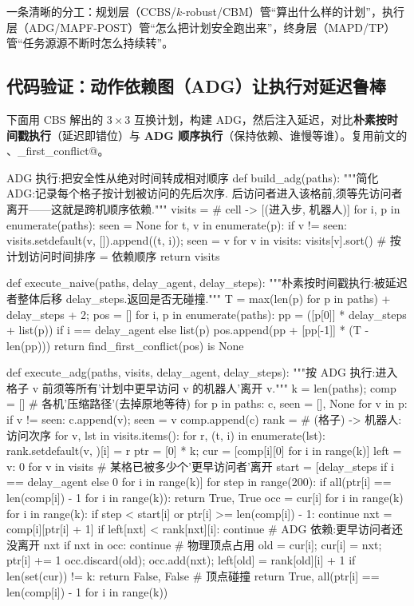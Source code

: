 一条清晰的分工：规划层（CCBS/$k$-robust/CBM）管“算出什么样的计划”，执行层（ADG/MAPF-POST）管“怎么把计划安全跑出来”，终身层（MAPD/TP）管“任务源源不断时怎么持续转”。

\subsection{代码验证：动作依赖图（ADG）让执行对延迟鲁棒}
\label{sec:mapf-adg-code}

下面用 CBS 解出的 $3\times 3$ 互换计划，构建 ADG，然后注入延迟，对比\textbf{朴素按时间戳执行}（延迟即错位）与 \textbf{ADG 顺序执行}（保持依赖、谁慢等谁）。复用前文的 \verb@cbs@、\verb@find_first_conflict@。

\begin{codebox}[Python]{ADG 执行:把安全性从绝对时间转成相对顺序}
def build_adg(paths):
    """简化 ADG:记录每个格子按计划被访问的先后次序.
    后访问者进入该格前,须等先访问者离开——这就是跨机顺序依赖."""
    visits = {}                                   # cell -> [(进入步, 机器人)]
    for i, p in enumerate(paths):
        seen = None
        for t, v in enumerate(p):
            if v != seen: visits.setdefault(v, []).append((t, i)); seen = v
    for v in visits: visits[v].sort()             # 按计划访问时间排序 = 依赖顺序
    return visits

def execute_naive(paths, delay_agent, delay_steps):
    """朴素按时间戳执行:被延迟者整体后移 delay_steps.返回是否无碰撞."""
    T = max(len(p) for p in paths) + delay_steps + 2; pos = []
    for i, p in enumerate(paths):
        pp = ([p[0]] * delay_steps + list(p)) if i == delay_agent else list(p)
        pos.append(pp + [pp[-1]] * (T - len(pp)))
    return find_first_conflict(pos) is None

def execute_adg(paths, visits, delay_agent, delay_steps):
    """按 ADG 执行:进入格子 v 前须等所有'计划中更早访问 v 的机器人'离开 v."""
    k = len(paths); comp = []                      # 各机'压缩路径'(去掉原地等待)
    for p in paths:
        c, seen = [], None
        for v in p:
            if v != seen: c.append(v); seen = v
        comp.append(c)
    rank = {}                                      # (格子) -> {机器人: 访问次序}
    for v, lst in visits.items():
        for r, (t, i) in enumerate(lst): rank.setdefault(v, {})[i] = r
    ptr = [0] * k; cur = [comp[i][0] for i in range(k)]
    left = {v: 0 for v in visits}                  # 某格已被多少个'更早访问者'离开
    start = [delay_steps if i == delay_agent else 0 for i in range(k)]
    for step in range(200):
        if all(ptr[i] == len(comp[i]) - 1 for i in range(k)): return True, True
        occ = {cur[i] for i in range(k)}
        for i in range(k):
            if step < start[i] or ptr[i] >= len(comp[i]) - 1: continue
            nxt = comp[i][ptr[i] + 1]
            if left[nxt] < rank[nxt][i]: continue   # ADG 依赖:更早访问者还没离开 nxt
            if nxt in occ: continue                 # 物理顶点占用
            old = cur[i]; cur[i] = nxt; ptr[i] += 1
            occ.discard(old); occ.add(nxt); left[old] = rank[old][i] + 1
        if len(set(cur)) != k: return False, False  # 顶点碰撞
    return True, all(ptr[i] == len(comp[i]) - 1 for i in range(k))


\end{codebox}
